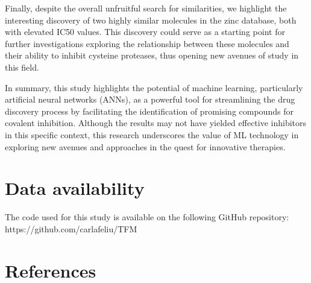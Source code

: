 \documentclass[final,times,twocolumn,article]{elsarticle}
\begin{document}
Finally, despite the overall unfruitful search for similarities, we highlight the interesting discovery of two highly similar molecules in the zinc database, both with elevated IC50 values. This discovery could serve as a starting point for further investigations exploring the relationship between these molecules and their ability to inhibit cysteine proteases, thus opening new avenues of study in this field.

In summary, this study highlights the potential of machine learning, particularly artificial neural networks (ANNs), as a powerful tool for streamlining the drug discovery process by facilitating the identification of promising compounds for covalent inhibition. Although the results may not have yielded effective inhibitors in this specific context, this research underscores the value of ML technology in exploring new avenues and approaches in the quest for innovative therapies.

\appendix

\section{Data availability}

The code used for this study is available on the following GitHub repository: https://github.com/carlafeliu/TFM

\section{References}
 

\end{document}
